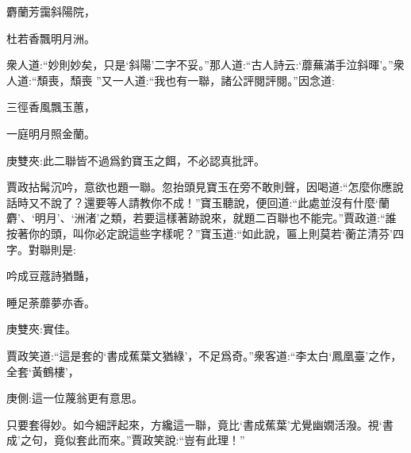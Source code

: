 \begin{poem}
    \begin{pl}    麝蘭芳靄斜陽院，\end{pl}

    \begin{pl}    杜若香飄明月洲。\end{pl}
\end{poem}


\begin{parag}
    衆人道:“妙則妙矣，只是‘斜陽’二字不妥。”那人道:“古人詩云:‘蘼蕪滿手泣斜暉’。”衆人道:“頹喪，頹喪 ”又一人道:“我也有一聯，諸公評閱評閱。”因念道:
\end{parag}


\begin{poem}
    \begin{pl}三徑香風飄玉蕙，\end{pl}

    \begin{pl}一庭明月照金蘭。\end{pl}
    \begin{note}庚雙夾:此二聯皆不過爲釣寶玉之餌，不必認真批評。\end{note}
\end{poem}


\begin{parag}
    賈政拈髯沉吟，意欲也題一聯。忽抬頭見寶玉在旁不敢則聲，因喝道:“怎麼你應說話時又不說了？還要等人請教你不成！”寶玉聽說，便回道:“此處並沒有什麼‘蘭麝’、‘明月’、‘洲渚’之類，若要這樣著跡說來，就題二百聯也不能完。”賈政道:“誰按著你的頭，叫你必定說這些字樣呢？”寶玉道:“如此說，匾上則莫若‘蘅芷清芬’四字。對聯則是:
\end{parag}


\begin{poem}
    \begin{pl}吟成豆蔻詩猶豔，\end{pl}
    \begin{pl}睡足荼蘼夢亦香。\end{pl}\begin{note}庚雙夾:實佳。\end{note}
\end{poem}


\begin{parag}
    賈政笑道:“這是套的‘書成蕉葉文猶綠’，不足爲奇。”衆客道:“李太白‘鳳凰臺’之作，全套‘黃鶴樓’，\begin{note}庚側:這一位蔑翁更有意思。\end{note}只要套得妙。如今細評起來，方纔這一聯，竟比‘書成蕉葉’尤覺幽嫺活潑。視‘書成’之句，竟似套此而來。”賈政笑說:“豈有此理！”
\end{parag}


